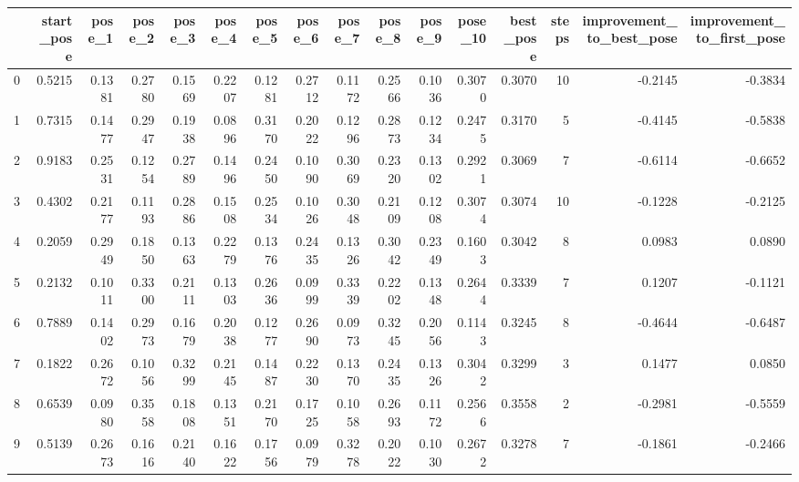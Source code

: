 \begin{tabular}{lrrrrrrrrrrrrrrr}
\toprule
{} &  start\_pose &  pose\_1 &  pose\_2 &  pose\_3 &  pose\_4 &  pose\_5 &  pose\_6 &  pose\_7 &  pose\_8 &  pose\_9 &  pose\_10 &  best\_pose &  steps &  improvement\_to\_best\_pose &  improvement\_to\_first\_pose \\
\midrule
0 &      0.5215 &  0.1381 &  0.2780 &  0.1569 &  0.2207 &  0.1281 &  0.2712 &  0.1172 &  0.2566 &  0.1036 &   0.3070 &     0.3070 &     10 &                   -0.2145 &                    -0.3834 \\
1 &      0.7315 &  0.1477 &  0.2947 &  0.1938 &  0.0896 &  0.3170 &  0.2022 &  0.1296 &  0.2873 &  0.1234 &   0.2475 &     0.3170 &      5 &                   -0.4145 &                    -0.5838 \\
2 &      0.9183 &  0.2531 &  0.1254 &  0.2789 &  0.1496 &  0.2450 &  0.1090 &  0.3069 &  0.2320 &  0.1302 &   0.2921 &     0.3069 &      7 &                   -0.6114 &                    -0.6652 \\
3 &      0.4302 &  0.2177 &  0.1193 &  0.2886 &  0.1508 &  0.2534 &  0.1026 &  0.3048 &  0.2109 &  0.1208 &   0.3074 &     0.3074 &     10 &                   -0.1228 &                    -0.2125 \\
4 &      0.2059 &  0.2949 &  0.1850 &  0.1363 &  0.2279 &  0.1376 &  0.2435 &  0.1326 &  0.3042 &  0.2349 &   0.1603 &     0.3042 &      8 &                    0.0983 &                     0.0890 \\
5 &      0.2132 &  0.1011 &  0.3300 &  0.2111 &  0.1303 &  0.2636 &  0.0999 &  0.3339 &  0.2202 &  0.1348 &   0.2644 &     0.3339 &      7 &                    0.1207 &                    -0.1121 \\
6 &      0.7889 &  0.1402 &  0.2973 &  0.1679 &  0.2038 &  0.1277 &  0.2690 &  0.0973 &  0.3245 &  0.2056 &   0.1143 &     0.3245 &      8 &                   -0.4644 &                    -0.6487 \\
7 &      0.1822 &  0.2672 &  0.1056 &  0.3299 &  0.2145 &  0.1487 &  0.2230 &  0.1370 &  0.2435 &  0.1326 &   0.3042 &     0.3299 &      3 &                    0.1477 &                     0.0850 \\
8 &      0.6539 &  0.0980 &  0.3558 &  0.1808 &  0.1351 &  0.2170 &  0.1725 &  0.1058 &  0.2693 &  0.1172 &   0.2566 &     0.3558 &      2 &                   -0.2981 &                    -0.5559 \\
9 &      0.5139 &  0.2673 &  0.1616 &  0.2140 &  0.1622 &  0.1756 &  0.0979 &  0.3278 &  0.2022 &  0.1030 &   0.2672 &     0.3278 &      7 &                   -0.1861 &                    -0.2466 \\
\bottomrule
\end{tabular}
